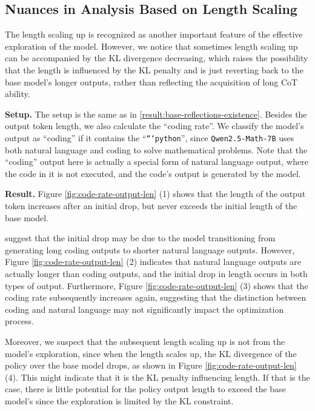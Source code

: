 \subsection{Nuances in Analysis Based on Length Scaling}
\label{sec:analysis-length-scaling} 

The length scaling up is recognized as another important feature of the effective exploration of the model. However, we notice that sometimes length scaling up can be accompanied by the KL divergence decreasing, which raises the possibility that the length is influenced by the KL penalty and is just reverting back to the base model's longer outputs, rather than reflecting the acquisition of long CoT ability.

\noindent\textbf{Setup.} The setup is the same as in \textsection\ref{result:base-reflections-existence}. Besides the output token length, we also calculate the ``coding rate''. We classify the model's output as ``coding'' if it contains the ``\texttt{```python}'', since \texttt{Qwen2.5-Math-7B} uses both natural language and coding to solve mathematical problems. Note that the ``coding'' output here is actually a special form of natural language output, where the code in it is not executed, and the code's output is generated by the model.

\noindent\textbf{Result.} Figure \ref{fig:code-rate-output-len} (1) shows that the length of the output token increases after an initial drop, but never exceeds the initial length of the base model.

\citet{zeng2025simplerl} suggest that the initial drop may be due to the model transitioning from generating long coding outputs to shorter natural language outputs. However, Figure \ref{fig:code-rate-output-len} (2) indicates that natural language outputs are actually longer than coding outputs, and the initial drop in length occurs in both types of output. Furthermore, Figure \ref{fig:code-rate-output-len} (3) shows that the coding rate subsequently increases again, suggesting that the distinction between coding and natural language may not significantly impact the optimization process.

Moreover, we suspect that the subsequent length scaling up is not from the model's exploration, since when the length scales up, the KL divergence of the policy over the base model drops, as shown in Figure \ref{fig:code-rate-output-len} (4). This might indicate that it is the KL penalty influencing length. If that is the case, there is little potential for the policy output length to exceed the base model's since the exploration is limited by the KL constraint.

